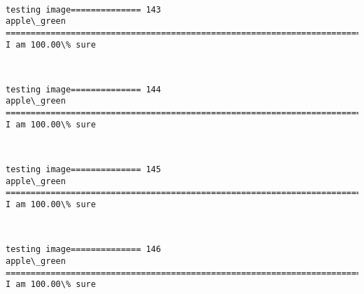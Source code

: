\documentclass[11pt]{article}
\begin{document}
    \begin{center}
    \end{center}
    { \hspace*{\fill} \\}
    
    \begin{Verbatim}[commandchars=\\\{\}]
testing image============== 143
apple\_green
============================================================================
I am 100.00\% sure

    \end{Verbatim}

    \begin{center}
    \end{center}
    { \hspace*{\fill} \\}
    
    \begin{Verbatim}[commandchars=\\\{\}]
testing image============== 144
apple\_green
============================================================================
I am 100.00\% sure

    \end{Verbatim}

    \begin{center}
    \end{center}
    { \hspace*{\fill} \\}
    
    \begin{Verbatim}[commandchars=\\\{\}]
testing image============== 145
apple\_green
============================================================================
I am 100.00\% sure

    \end{Verbatim}

    \begin{center}
    \end{center}
    { \hspace*{\fill} \\}
    
    \begin{Verbatim}[commandchars=\\\{\}]
testing image============== 146
apple\_green
============================================================================
I am 100.00\% sure

    \end{Verbatim}
\end{document}
